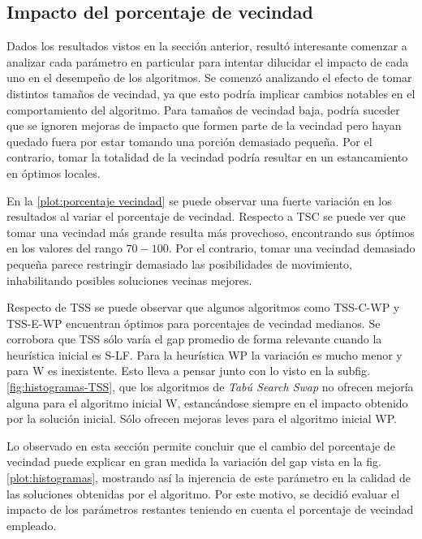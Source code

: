 \subsection{Impacto del porcentaje de vecindad}

Dados los resultados vistos en la sección anterior, resultó interesante comenzar a analizar cada parámetro en particular para intentar dilucidar el impacto de cada uno en el desempeño de los algoritmos. Se comenzó analizando el efecto de tomar distintos tamaños de vecindad, ya que esto podría implicar cambios notables en el comportamiento del algoritmo. Para tamaños de vecindad baja, podría suceder que se ignoren mejoras de impacto que formen parte de la vecindad pero hayan quedado fuera por estar tomando una porción demasiado pequeña. Por el contrario, tomar la totalidad de la vecindad podría resultar en un estancamiento en óptimos locales.

En la \cref{plot:porcentaje vecindad} se puede observar una fuerte variación en los resultados al variar el porcentaje de vecindad. Respecto a TSC se puede ver que tomar una vecindad más grande resulta más provechoso, encontrando sus óptimos en los valores del rango $70 - 100$. Por el contrario, tomar una vecindad demasiado pequeña parece restringir demasiado las posibilidades de movimiento, inhabilitando posibles soluciones vecinas mejores.

Respecto de TSS se puede observar que algunos algoritmos como TSS-C-WP y TSS-E-WP encuentran óptimos para porcentajes de vecindad medianos. Se corrobora que TSS sólo varía el gap promedio de forma relevante cuando la heurística inicial es S-LF. Para la heurística WP la variación es mucho menor y para W es inexistente. Esto lleva a pensar junto con lo visto en la subfig. \ref{fig:histogramas-TSS}, que los algoritmos de \textit{Tabú Search Swap} no ofrecen mejoría alguna para el algoritmo inicial W, estancándose siempre en el impacto obtenido por la solución inicial. Sólo ofrecen mejoras leves para el algoritmo inicial WP.
 
Lo observado en esta sección permite concluir que el cambio del porcentaje de vecindad puede explicar en gran medida la variación del gap vista en la fig. \ref{plot:histogramas}, mostrando así la injerencia de este parámetro en la calidad de las soluciones obtenidas por el algoritmo. Por este motivo, se decidió evaluar el impacto de los parámetros restantes teniendo en cuenta el porcentaje de vecindad empleado.

